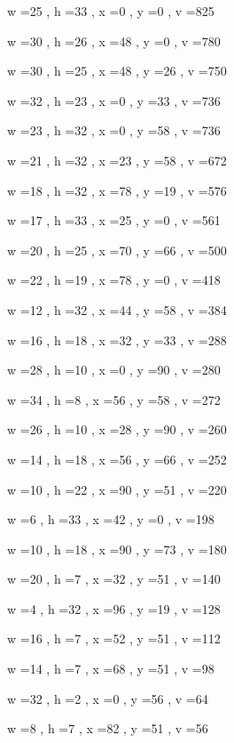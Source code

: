 \documentclass[11pt]{article}
\begin{document}
w =25 , h =33 , x =0 , y =0 , v =825
\par
w =30 , h =26 , x =48 , y =0 , v =780
\par
w =30 , h =25 , x =48 , y =26 , v =750
\par
w =32 , h =23 , x =0 , y =33 , v =736
\par
w =23 , h =32 , x =0 , y =58 , v =736
\par
w =21 , h =32 , x =23 , y =58 , v =672
\par
w =18 , h =32 , x =78 , y =19 , v =576
\par
w =17 , h =33 , x =25 , y =0 , v =561
\par
w =20 , h =25 , x =70 , y =66 , v =500
\par
w =22 , h =19 , x =78 , y =0 , v =418
\par
w =12 , h =32 , x =44 , y =58 , v =384
\par
w =16 , h =18 , x =32 , y =33 , v =288
\par
w =28 , h =10 , x =0 , y =90 , v =280
\par
w =34 , h =8 , x =56 , y =58 , v =272
\par
w =26 , h =10 , x =28 , y =90 , v =260
\par
w =14 , h =18 , x =56 , y =66 , v =252
\par
w =10 , h =22 , x =90 , y =51 , v =220
\par
w =6 , h =33 , x =42 , y =0 , v =198
\par
w =10 , h =18 , x =90 , y =73 , v =180
\par
w =20 , h =7 , x =32 , y =51 , v =140
\par
w =4 , h =32 , x =96 , y =19 , v =128
\par
w =16 , h =7 , x =52 , y =51 , v =112
\par
w =14 , h =7 , x =68 , y =51 , v =98
\par
w =32 , h =2 , x =0 , y =56 , v =64
\par
w =8 , h =7 , x =82 , y =51 , v =56
\par
\newpage
\end{document}
